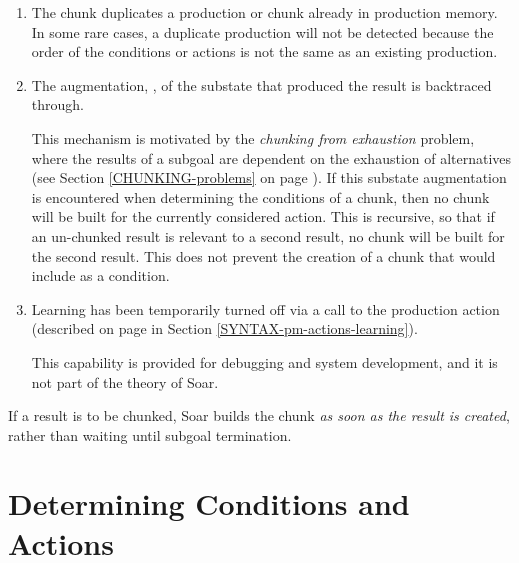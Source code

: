 \begin{enumerate}
\item The chunk duplicates a production or chunk already in production memory.
	In some rare cases, a duplicate production will not be detected because the
	order of the conditions or actions is not the same as an existing production.  

\item The augmentation, , of the substate that
	produced the result is backtraced through.

	This mechanism is motivated by the \emph{chunking from exhaustion}
	problem, where the results of a subgoal are dependent on the
	exhaustion of alternatives (see Section \ref{CHUNKING-problems} on page
	\pageref{CHUNKING-problems}). If this substate augmentation is
	encountered when determining the conditions of a chunk, then no chunk
	will be built for the currently considered action. This is recursive, 
	so that if an un-chunked result is relevant to a second result, no 
	chunk will be built for the second result. This does not prevent the
	creation of a chunk that would include  as a
	condition.  
	 
      
\item Learning has been temporarily turned off via a call to the
	 production action (described on page
	\pageref{SYNTAX-pm-actions-learning} in Section 
	\ref{SYNTAX-pm-actions-learning}).

	This capability is provided for debugging and system development, and
	it is not part of the theory of Soar.
\end{enumerate}

If a result is to be chunked, Soar builds the chunk \emph{as soon as the
result is created}, rather than waiting until subgoal termination.


\section{Determining Conditions and Actions}
\label{CHUNKING-determining}

